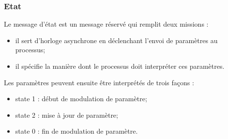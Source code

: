 \subsubsection{Etat}

\noindent Le message d'état est un message réservé qui remplit deux missions :
\vspace{-1em}
\begin{itemize}[noitemsep]
	\item il sert d'horloge asynchrone en déclenchant l'envoi de paramètres au processus;
	\item il spécifie la manière dont le processus doit interpréter ces paramètres.
\end{itemize}

\noindent Les paramètres peuvent ensuite être interprétés de trois façons :

\vspace{-1em}
\begin{itemize}[noitemsep]
	\item state 1 : début de modulation de paramètre;
	\item state 2 : mise à jour de paramètre;
	\item state 0 : fin de modulation de paramètre.	
\end{itemize}

